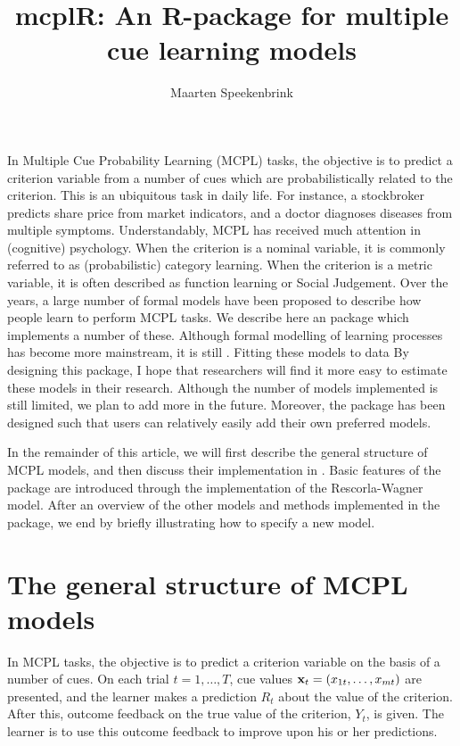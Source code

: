 \documentclass[doc]{apa}
\title{mcplR: An R-package for multiple cue learning models}
\author{Maarten Speekenbrink}
\affiliation{Department of Cognitive, Perceptual and Brain Sciences \\ University College London}
\renewcommand{\vec}[1]{\text{\bf{#1}}}
\newcommand{\code}[1]{{\ttfamily{#1}}}
\begin{document}
\maketitle

In Multiple Cue Probability Learning (MCPL) tasks, the objective is to predict a criterion variable from a number of cues which are probabilistically related to the criterion. This is an ubiquitous task in daily life. For instance, a stockbroker predicts share price from market indicators, and a doctor diagnoses diseases from multiple symptoms. Understandably, MCPL has received much attention in (cognitive) psychology. When the criterion is a nominal variable, it is commonly referred to as (probabilistic) category learning. When the criterion is a metric variable, it is often described as function learning or Social Judgement. Over the years, a large number of formal models have been proposed to describe how people learn to perform MCPL tasks. We describe here an \code{R} package which implements a number of these. Although formal modelling of learning processes has become more mainstream, it is still . Fitting these models to data By designing this package, I hope that researchers will find it more easy to estimate these models in their research. Although the number of models implemented is still limited, we plan to add more in the future. Moreover, the package has been designed such that users can relatively easily add their own preferred models. 

In the remainder of this article, we will first describe the general structure of MCPL models, and then discuss their implementation in \code{mcplR}. Basic features of the package are introduced through the implementation of the Rescorla-Wagner model. After an overview of the other models and methods implemented in the package, we end by briefly illustrating how to specify a new model. 

\section{The general structure of MCPL models}

In MCPL tasks, the objective is to predict a criterion variable on the basis of a number of cues. On each trial $t = 1,\ldots,T$, cue values $\vec{x}_t = (x_{1t},\ldots,x_{mt})$ are presented, and the learner makes a prediction $R_t$ about the value of the criterion. After this, outcome feedback on the true value of the criterion, $Y_t$, is given. The learner is to use this outcome feedback to improve upon his or her predictions.
\end{document}
